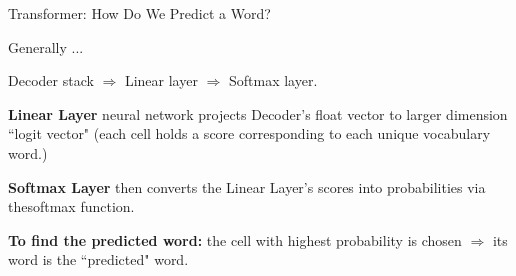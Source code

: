 \begin{frame}{Transformer: How Do We Predict a Word?}
    \large 
    
    Generally ...
    
    Decoder stack $\Rightarrow$ Linear layer $\Rightarrow$ Softmax layer. 

    \begin{itemizeSpaced}{7pt}
        \item \textbf{Linear Layer} neural network projects Decoder's float vector to larger dimension ``logit vector" (each cell holds a score corresponding to each unique vocabulary word.)
    
        \item \textbf{Softmax Layer} then converts the Linear Layer's scores into probabilities via thesoftmax function. 
    \end{itemizeSpaced}

    \textbf{To find the predicted word: } the cell with highest probability is chosen $\Rightarrow$ its word is the ``predicted" word. 

    
\end{frame}